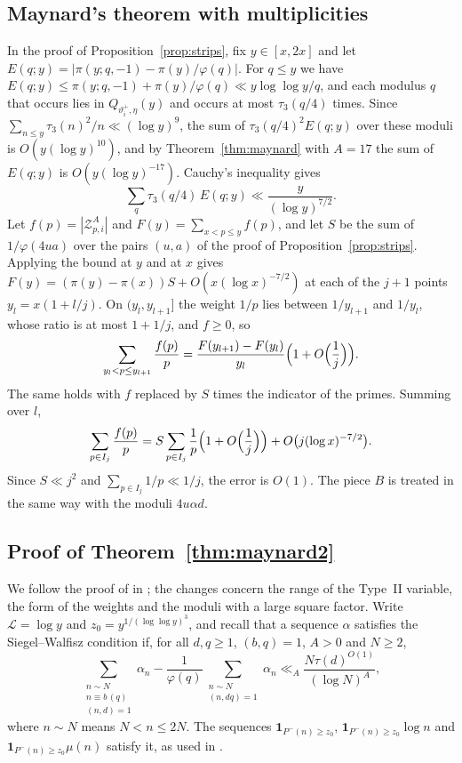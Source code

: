\documentclass[aps,prd,twocolumn,superscriptaddress,nofootinbib,longbibliography,floatfix,showkeys,nobalancelastpage,amsmath,amssymb,10pt]{revtex4-2}
\theoremstyle{plain}
\theoremstyle{definition}
\theoremstyle{plain}
\newcommand{\Zc}{\mathcal{Z}}
\newcommand{\one}{\mathbf{1}}
\begin{document}
\subsection{Maynard's theorem with multiplicities}\label{app:maynard}

In the proof of Proposition~\ref{prop:strips}, fix $y\in[x,2x]$ and let $E(q;y)=|\pi(y;q,-1)-\pi(y)/\varphi(q)|$. For $q\le y$ we have $E(q;y)\le\pi(y;q,-1)+\pi(y)/\varphi(q)\ll y\log\log y/q$, and each modulus $q$ that occurs lies in $Q_{\vartheta_i^+,\eta}(y)$ and occurs at most $\tau_3(q/4)$ times. Since $\sum_{n\le y}\tau_3(n)^2/n\ll(\log y)^9$, the sum of $\tau_3(q/4)^2E(q;y)$ over these moduli is $O(y(\log y)^{10})$, and by Theorem~\ref{thm:maynard} with $A=17$ the sum of $E(q;y)$ is $O(y(\log y)^{-17})$. Cauchy's inequality gives
\[
\sum_q\tau_3(q/4)\,E(q;y)\ll\frac y{(\log y)^{7/2}}.
\]
Let $f(p)=|\Zc^A_{p,i}|$ and $F(y)=\sum_{x<p\le y}f(p)$, and let $S$ be the sum of $1/\varphi(4ua)$ over the pairs $(u,a)$ of the proof of Proposition~\ref{prop:strips}. Applying the bound at $y$ and at $x$ gives $F(y)=(\pi(y)-\pi(x))S+O(x(\log x)^{-7/2})$ at each of the $j+1$ points $y_l=x(1+l/j)$. On $(y_l,y_{l+1}]$ the weight $1/p$ lies between $1/y_{l+1}$ and $1/y_l$, whose ratio is at most $1+1/j$, and $f\ge0$, so
\[
\sum_{y_l<p\le y_{l+1}}\frac{f(p)}p=\frac{F(y_{l+1})-F(y_l)}{y_l}\Bigl(1+O\Bigl(\frac1j\Bigr)\Bigr).
\]
The same holds with $f$ replaced by $S$ times the indicator of the primes. Summing over $l$,
\[
\sum_{p\in I_j}\frac{f(p)}p=S\sum_{p\in I_j}\frac1p\Bigl(1+O\Bigl(\frac1j\Bigr)\Bigr)+O\bigl(j(\log x)^{-7/2}\bigr).
\]
Since $S\ll j^2$ and $\sum_{p\in I_j}1/p\ll1/j$, the error is $O(1)$. The piece $B$ is treated in the same way with the moduli $4u\alpha d$.

\subsection{Proof of Theorem~\ref{thm:maynard2}}\label{app:maynard2}

We follow the proof of \cite[Theorem~1.1]{May2} in \cite[Section~5]{May2}; the changes concern the range of the Type~II variable, the form of the weights and the moduli with a large square factor. Write $\mathcal L=\log y$ and $z_0=y^{1/(\log\log y)^3}$, and recall that a sequence $\alpha$ satisfies the Siegel--Walfisz condition if, for all $d,q\ge1$, $(b,q)=1$, $A>0$ and $N\ge2$,
\begin{equation}\label{eq:sw}
\sum_{\substack{n\sim N\\n\equiv b\,(q)\\(n,d)=1}}\alpha_n-\frac1{\varphi(q)}\sum_{\substack{n\sim N\\(n,dq)=1}}\alpha_n\ll_A\frac{N\tau(d)^{O(1)}}{(\log N)^A},
\end{equation}
where $n\sim N$ means $N<n\le2N$. The sequences $\one_{P^-(n)\ge z_0}$, $\one_{P^-(n)\ge z_0}\log n$ and $\one_{P^-(n)\ge z_0}\mu(n)$ satisfy it, as used in \cite[Section~5]{May2}.
\end{document}
